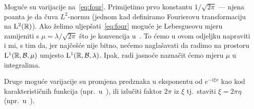 \documentclass[main.tex]{subfiles}
\begin{document}
\begin{komentar}\label{kom:four1}
	Moguće su varijacije na~\eqref{eq:four}.
	Primijetimo prvo konstantu \( 1/\sqrt{2\pi} \) --- njena poanta je da čuva
	\( L^2 \)-normu (jednom kad definiramo Fourierovu transformaciju na \( \mathrm{L}^2(\mathbb{R}) \)).
	Ako želimo uljepšati~\eqref{eq:four} moguće je Lebesgueovu mjeru
	zamijeniti s \( \mu = \lambda/\sqrt{2\pi} \) što je konvencija
	u~\cite[]{rudin}. To ćemo u ovom odjeljku napraviti i mi,
	s tim da, jer najčešće nije bitno, nećemo naglašavati da radimo
	na prostoru \( \mathrm{L}^1( \mathbb{R}, \mathcal B, \mu ) \) umjesto
	\( \mathrm{L}^1 (\mathbb{R}, \mathcal B, \lambda ) \). Ipak, radi jasnoće naznačit ćemo
	mjeru \( \mu \) u integralima.

	Druge moguće varijacije su promjena predznaka u eksponentu od
	\( e^{-i\xi x} \) kao kod karakterističnih funkcija (npr.\ u~\cite{fidta}), ili izlučiti faktor
	\( 2\pi \) iz \( \xi \) tj.\ staviti \( \xi = 2\pi\eta \) (npr.\ u~\cite{kovac-wroclaw}).
\end{komentar}
\end{document}
